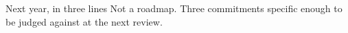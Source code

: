 \begin{frame}{Next year, in three lines}
  Not a roadmap. Three commitments specific enough to be judged against at the next review.
\end{frame}
